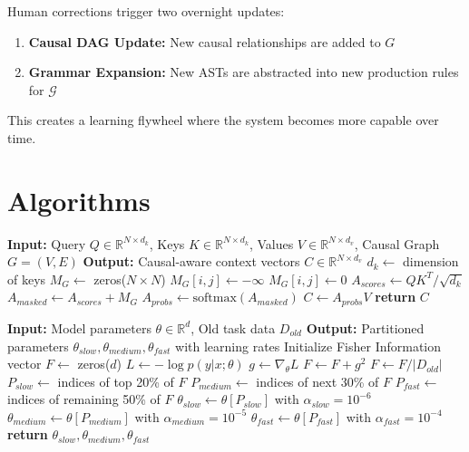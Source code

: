 \documentclass{article}
\begin{document}
Human corrections trigger two overnight updates:
\begin{enumerate}
    \item \textbf{Causal DAG Update:} New causal relationships are added to $G$
    \item \textbf{Grammar Expansion:} New ASTs are abstracted into new production rules for $\mathcal{G}$
\end{enumerate}

This creates a learning flywheel where the system becomes more capable over time.

\section{Algorithms}

\begin{algorithm}[t]
\caption{Causal Attention Mechanism}
\label{alg:causal_attention}
\begin{algorithmic}[1]
\STATE \textbf{Input:} Query $Q \in \mathbb{R}^{N \times d_k}$, Keys $K \in \mathbb{R}^{N \times d_k}$, Values $V \in \mathbb{R}^{N \times d_v}$, Causal Graph $G = (V, E)$
\STATE \textbf{Output:} Causal-aware context vectors $C \in \mathbb{R}^{N \times d_v}$
\STATE $d_k \leftarrow$ dimension of keys
\STATE $M_G \leftarrow$ zeros($N \times N$)
            \STATE $M_G[i,j] \leftarrow -\infty$
        \ELSE
            \STATE $M_G[i,j] \leftarrow 0$
        \ENDIF
    \ENDFOR
\ENDFOR
\STATE $A_{scores} \leftarrow QK^T / \sqrt{d_k}$
\STATE $A_{masked} \leftarrow A_{scores} + M_G$
\STATE $A_{probs} \leftarrow \text{softmax}(A_{masked})$
\STATE $C \leftarrow A_{probs} V$
\STATE \textbf{return} $C$
\end{algorithmic}
\end{algorithm}

\begin{algorithm}[t]
\caption{Selective Plasticity Scheduler}
\label{alg:selective_plasticity}
\begin{algorithmic}[1]
\STATE \textbf{Input:} Model parameters $\theta \in \mathbb{R}^d$, Old task data $D_{old}$
\STATE \textbf{Output:} Partitioned parameters $\theta_{slow}, \theta_{medium}, \theta_{fast}$ with learning rates
\STATE Initialize Fisher Information vector $F \leftarrow$ zeros($d$)
    \STATE $L \leftarrow -\log p(y|x; \theta)$
    \STATE $g \leftarrow \nabla_\theta L$
    \STATE $F \leftarrow F + g^2$
\ENDFOR
\STATE $F \leftarrow F/|D_{old}|$
\STATE $P_{slow} \leftarrow$ indices of top 20\% of $F$
\STATE $P_{medium} \leftarrow$ indices of next 30\% of $F$
\STATE $P_{fast} \leftarrow$ indices of remaining 50\% of $F$
\STATE $\theta_{slow} \leftarrow \theta[P_{slow}]$ with $\alpha_{slow} = 10^{-6}$
\STATE $\theta_{medium} \leftarrow \theta[P_{medium}]$ with $\alpha_{medium} = 10^{-5}$
\STATE $\theta_{fast} \leftarrow \theta[P_{fast}]$ with $\alpha_{fast} = 10^{-4}$
\STATE \textbf{return} $\theta_{slow}, \theta_{medium}, \theta_{fast}$
\end{algorithmic}
\end{algorithm}
\end{document}

